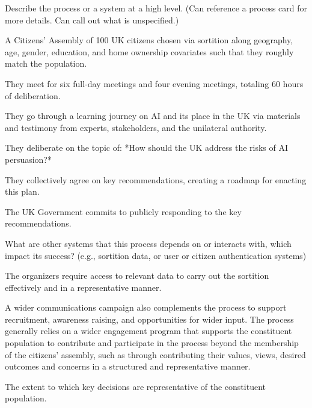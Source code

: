     \begin{describe}[grey]
        Describe the process or a system at a high level. (Can reference a process card for more details. Can call out what is unspecified.)
    \end{describe}

    \begin{noitemize}
        \item A Citizens' Assembly of 100 UK citizens chosen via sortition along geography, age, gender, education, and home ownership covariates such that they roughly match the population.   
        \item They meet for six full-day meetings and four evening meetings, totaling 60 hours of deliberation.  
        \item They go through a learning journey on AI and its place in the UK via materials and testimony from experts, stakeholders, and the unilateral authority.
        \item They deliberate on the topic of: *How should the UK address the risks of AI persuasion?*  
        \item They collectively agree on key recommendations, creating a roadmap for enacting this plan.
        \item The UK Government commits to publicly responding to the key recommendations.
    \end{noitemize}

    \begin{describe}[grey]
        What are other systems that this process depends on or interacts with, which impact its success? (e.g., sortition data, or user or citizen authentication systems)
    \end{describe}

    The organizers require access to relevant data to carry out the sortition effectively and in a representative manner.

    A wider communications campaign also complements the process to support recruitment, awareness raising, and opportunities for wider input. The process generally relies on a wider engagement program that supports the constituent population to contribute and participate in the process beyond the membership of the citizens' assembly, such as through contributing their values, views, desired outcomes and concerns in a structured and representative manner.


    \begin{describe}[grey]
        The extent to which key decisions are representative of the constituent population.
    \end{describe}

